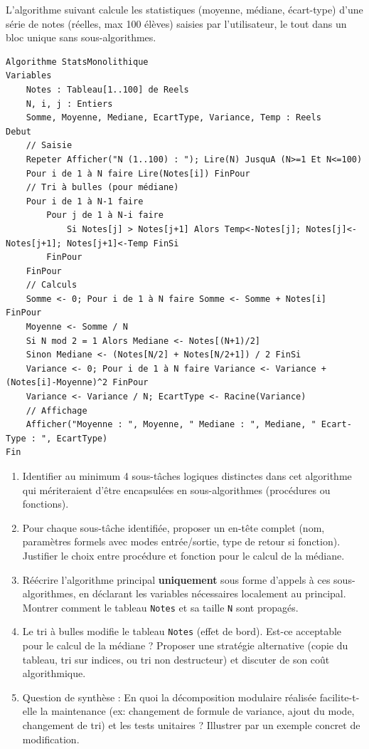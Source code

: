 \documentclass[11pt]{article}
\begin{document}
\begin{exercice}
L'algorithme suivant calcule les statistiques (moyenne, médiane, écart-type) d'une série de notes (réelles, max 100 élèves) saisies par l'utilisateur, le tout dans un bloc unique sans sous-algorithmes.

\begin{verbatim}
Algorithme StatsMonolithique
Variables
    Notes : Tableau[1..100] de Reels
    N, i, j : Entiers
    Somme, Moyenne, Mediane, EcartType, Variance, Temp : Reels
Debut
    // Saisie
    Repeter Afficher("N (1..100) : "); Lire(N) JusquA (N>=1 Et N<=100)
    Pour i de 1 à N faire Lire(Notes[i]) FinPour
    // Tri à bulles (pour médiane)
    Pour i de 1 à N-1 faire
        Pour j de 1 à N-i faire
            Si Notes[j] > Notes[j+1] Alors Temp<-Notes[j]; Notes[j]<-Notes[j+1]; Notes[j+1]<-Temp FinSi
        FinPour
    FinPour
    // Calculs
    Somme <- 0; Pour i de 1 à N faire Somme <- Somme + Notes[i] FinPour
    Moyenne <- Somme / N
    Si N mod 2 = 1 Alors Mediane <- Notes[(N+1)/2]
    Sinon Mediane <- (Notes[N/2] + Notes[N/2+1]) / 2 FinSi
    Variance <- 0; Pour i de 1 à N faire Variance <- Variance + (Notes[i]-Moyenne)^2 FinPour
    Variance <- Variance / N; EcartType <- Racine(Variance)
    // Affichage
    Afficher("Moyenne : ", Moyenne, " Mediane : ", Mediane, " Ecart-Type : ", EcartType)
Fin
\end{verbatim}

\begin{enumerate}
    \item Identifier au minimum 4 sous-tâches logiques distinctes dans cet algorithme qui mériteraient d'être encapsulées en sous-algorithmes (procédures ou fonctions).
    \item Pour chaque sous-tâche identifiée, proposer un en-tête complet (nom, paramètres formels avec modes entrée/sortie, type de retour si fonction). Justifier le choix entre procédure et fonction pour le calcul de la médiane.
    \item Réécrire l'algorithme principal \textbf{uniquement} sous forme d'appels à ces sous-algorithmes, en déclarant les variables nécessaires localement au principal. Montrer comment le tableau \texttt{Notes} et sa taille \texttt{N} sont propagés.
    \item Le tri à bulles modifie le tableau \texttt{Notes} (effet de bord). Est-ce acceptable pour le calcul de la médiane ? Proposer une stratégie alternative (copie du tableau, tri sur indices, ou tri non destructeur) et discuter de son coût algorithmique.
    \item Question de synthèse : En quoi la décomposition modulaire réalisée facilite-t-elle la maintenance (ex: changement de formule de variance, ajout du mode, changement de tri) et les tests unitaires ? Illustrer par un exemple concret de modification.
\end{enumerate}
\end{exercice}
\end{document}
